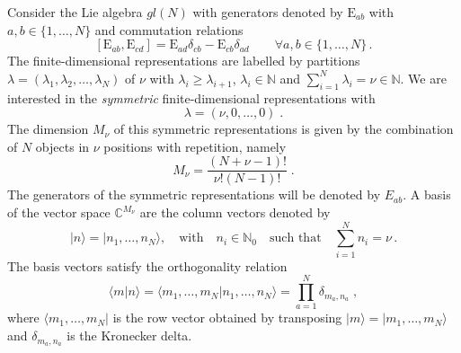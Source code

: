 \documentclass[10pt]{article}
\numberwithin{equation}{section}
\numberwithin{equation}{subsection}
\newcommand{\co}{\;,}
\newcommand{\dt}{\;.}
\newcommand{\EE}{\mathrm{E}}
\newcommand{\twoj}{\nu}
\begin{document}
Consider the Lie algebra ${gl}(N)$ with generators denoted by $\EE_{ab}$ with $a,b\in \{1,\ldots,N\}$ and commutation relations
\begin{equation}\label{eq:comgl}
\left[\EE_{ab},\EE_{cd}\right]=\EE_{ad}\delta_{cb}-\EE_{cb}\delta_{ad}\qquad \forall a,b\in \{1,\ldots,N\}\,.
\end{equation}
The finite-dimensional representations are labelled by partitions $\lambda=(\lambda_1,\lambda_2,\ldots,\lambda_N)$ of $\nu$ with  $\lambda_i\geq \lambda_{i+1}$,  $\lambda_i\in \mathbb{N}$ and $\sum_{i=1}^N \lambda_i = \nu\in\mathbb{N}$.  
We are interested in the {\em symmetric} finite-dimensional representations with 
\begin{equation}\label{eq:dynkin}
    \lambda=(\twoj,0,\ldots,0) \;.
\end{equation} 
The dimension $M_\twoj$ of this symmetric representations is given by the combination of $N$ objects in $\twoj$ positions with repetition, namely
\begin{equation}
	M_\twoj= \frac{(N+\twoj-1)!}{\twoj  !(N-1)!}\dt
\end{equation} 
The generators of the symmetric representations will be denoted by $E_{ab}$.
A basis of the vector space $\mathbb{C}^{M_\twoj}$ are the column vectors denoted by
\begin{equation}
  |n\rangle=  |n_{1},\ldots,n_{N}\rangle,\quad \text{with}\quad n_{i}\in\mathbb{N}_{0}\quad \text{such that}\quad \sum_{i=1}^{N}n_{i}=\nu\,.
\end{equation}
The basis vectors satisfy the orthogonality relation
\begin{equation}\label{ortho}
   \langle m|n \rangle =\langle m_{1},\ldots,m_{N}|n_{1},\ldots,n_{N}\rangle=\prod_{a=1}^{N}\delta_{m_{a},n_{a}}\co
\end{equation}
where  $ \langle m_{1},\ldots,m_{N}|$ is the row vector obtained by transposing $|m\rangle=|m_{1},\ldots,m_{N}\rangle$ and $\delta_{m_{a},n_{a}}$ is the Kronecker delta. 
\end{document}
